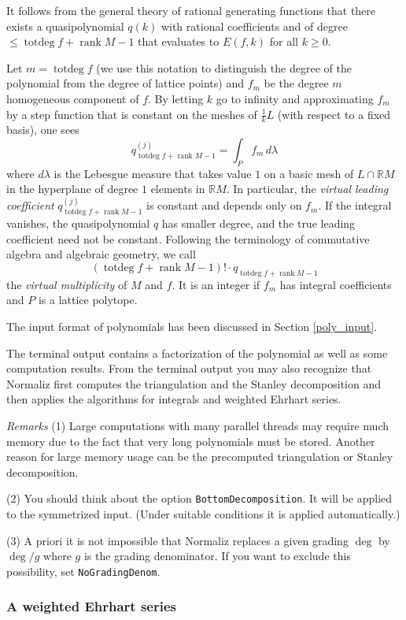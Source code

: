 \documentclass[12pt,a4paper]{scrartcl}
\theoremstyle{definition}
\def\RR{{\mathbb R}}
\DeclareMathOperator{\rank}{rank}
\DeclareMathOperator{\totdeg}{totdeg}
\begin{document}
{It follows from the general theory of rational generating
functions that there exists a quasipolynomial $q(k)$ with
rational coefficients and of degree $\le \totdeg f+\rank M-1$ that
evaluates to $E(f,k)$ for all $k\ge 0$.

Let $m=\totdeg f$ (we use this notation to distinguish the degree of the polynomial from the degree of lattice points) and $f_m$ be the degree $m$ homogeneous
component of $f$. By letting $k$ go to infinity and
approximating $f_m$ by a step function that is constant on the
meshes of $\frac 1kL$ (with respect to a fixed basis), one sees
$$
q^{(j)}_{\totdeg f+\rank M-1}=\int_P f_m\, d\lambda
$$
where $d\lambda$ is the Lebesgue measure that takes value $1$
on a basic mesh of $L\cap \RR M$ in the hyperplane of degree
$1$ elements in $\RR M$. In particular, the \emph{virtual
	leading coefficient} $q^{(j)}_{\totdeg f+\rank M-1}$ is
constant and depends only on $f_m$. If the integral vanishes,
the quasipolynomial $q$ has smaller degree, and the true
leading coefficient need not be constant. Following the
terminology of commutative algebra and algebraic geometry, we
call
$$
(\totdeg f+\rank M-1)!\cdot q_{\totdeg f+\rank M-1}
$$
the \emph{virtual multiplicity} of $M$ and $f$. It is an
integer if $f_m$ has integral coefficients and $P$ is a lattice
polytope.

The input format of polynomials has been discussed in Section \ref{poly_input}.

The terminal output contains a factorization of the polynomial as well as some computation results. From the terminal output you may also recognize that Normaliz first computes the triangulation and the Stanley decomposition and then applies the algorithms for integrals and  weighted Ehrhart series.

\emph{Remarks} \enspace (1) Large computations with many parallel threads may require much memory due to the fact that very long polynomials must be stored. Another reason for large memory usage can be the precomputed triangulation or Stanley decomposition.

(2) You should think about the option \verb|BottomDecomposition|. It will be applied to the symmetrized input. (Under suitable conditions it is applied automatically.)

(3) A priori it is not impossible that Normaliz replaces a given grading $\deg$ by $\deg/g$ where $g$ is the grading denominator. If you want to exclude this possibility, set \verb|NoGradingDenom|.
 

\subsubsection{A weighted Ehrhart series}

}
\end{document}
